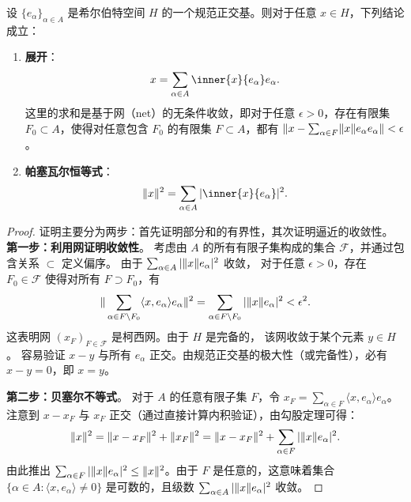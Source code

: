 \begin{theorem}
    设 \(\{e_\alpha\}_{\alpha \in A}\) 是希尔伯特空间 \(H\) 的一个规范正交基。则对于任意
    \(x \in H\)，下列结论成立：
    \begin{enumerate}
        \item \textbf{展开}：
            \[
                x = \sum_{\alpha \in A} \inner{x}{e_\alpha} e_\alpha.
            \]
            这里的求和是基于网（net）的无条件收敛，即对于任意 \(\epsilon > 0\)，存在有限集 \(F_0
            \subset A\)，使得对任意包含 \(F_0\) 的有限集 \(F \subset A\)，都有 \(\|x
                - \sum_{\alpha \in F} \lVert x\rVert{e_\alpha}
            e_\alpha\| < \epsilon\)。
        \item \textbf{帕塞瓦尔恒等式}：
            \[
                \|x\|^2 = \sum_{\alpha \in A} |\inner{x}{e_\alpha}|^2.
            \]
    \end{enumerate}
\end{theorem}

\begin{proof}
    证明主要分为两步：首先证明部分和的有界性，其次证明逼近的收敛性。
    \textbf{第一步：利用网证明收敛性}。
    考虑由 \(A\) 的所有有限子集构成的集合 \(\mathcal{F}\)，并通过包含关系 \(\subset\) 定义偏序。
    由于 \(\sum_{\alpha \in A} |\lVert x\rVert{e_\alpha}|^2\) 收敛，
    对于任意 \(\epsilon > 0\)，存在 \(F_0 \in \mathcal{F}\) 使得对所有
    \(F \supset F_0\)，有
    \[
        \| \sum_{\alpha \in F \setminus F_0} \langle x, e_\alpha
        \rangle e_\alpha \|^2 = \sum_{\alpha \in F \setminus F_0}
        |\lVert x\rVert{e_\alpha}|^2 < \epsilon^2.
    \]
    这表明网 \((x_F)_{F \in \mathcal{F}}\) 是柯西网。由于 \(H\) 是完备的，
    该网收敛于某个元素 \(y \in H\)。
    容易验证 \(x - y\) 与所有 \(e_\alpha\) 正交。由规范正交基的极大性（或完备性），必有 \(x - y =
    0\)，即 \(x = y\)。

    \textbf{第二步：贝塞尔不等式}。
    对于 \(A\) 的任意有限子集 \(F\)，令 \(x_F = \sum_{\alpha \in F} \langle x,
    e_\alpha \rangle e_\alpha\)。注意到 \(x - x_F\) 与 \(x_F\)
    正交（通过直接计算内积验证），由勾股定理可得：
    \[
        \|x\|^2 = \|x - x_F\|^2 + \|x_F\|^2 = \|x - x_F\|^2 +
        \sum_{\alpha \in F} |\lVert x\rVert{e_\alpha}|^2.
    \]
    由此推出 \(\sum_{\alpha \in F} |\lVert x\rVert{e_\alpha}|^2 \le
    \|x\|^2\)。由于 \(F\) 是任意的，这意味着集合 \(\{\alpha \in A : \langle x,
    e_\alpha \rangle \neq 0\}\) 是可数的，且级数 \(\sum_{\alpha \in A}
    |\lVert x\rVert{e_\alpha}|^2\) 收敛。
\end{proof}

